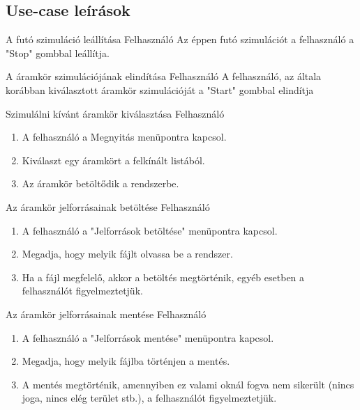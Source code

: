\subsection{Use-case leírások}
\label{sec:usecasedesc}

{A futó szimuláció leállítása}
{Felhasználó}
{Az éppen futó szimulációt a felhasználó a "Stop" gombbal leállítja.}

{A áramkör szimulációjának elindítása}
{Felhasználó}
{A felhasználó, az általa korábban kiválasztott áramkör szimulációját a "Start" gombbal elindítja}

{Szimulálni kívánt áramkör kiválasztása}
{Felhasználó}
{\vspace{-20pt}\begin{enumerate}
\setlength{\itemsep}{0cm}%
\setlength{\parskip}{0cm}%
\item A felhasználó a Megnyitás menüpontra kapcsol.
\item Kiválaszt egy áramkört a felkínált listából.
\item Az áramkör betöltődik a rendszerbe.
\end{enumerate}\vspace{-20pt}}

{Az áramkör jelforrásainak betöltése}
{Felhasználó}
{\vspace{-20pt}\begin{enumerate}
\setlength{\itemsep}{0cm}%
\setlength{\parskip}{0cm}%
\item A felhasználó a "Jelforrások betöltése" menüpontra kapcsol.
\item Megadja, hogy melyik fájlt olvassa be a rendszer.
\item Ha a fájl megfelelő, akkor a betöltés megtörténik, egyéb esetben a felhasználót figyelmeztetjük.
\end{enumerate}\vspace{-20pt}}

{Az áramkör jelforrásainak mentése}
{Felhasználó}
{\vspace{-20pt}\begin{enumerate}
\setlength{\itemsep}{0cm}%
\setlength{\parskip}{0cm}%
\item A felhasználó a "Jelforrások mentése" menüpontra kapcsol.
\item Megadja, hogy melyik fájlba történjen a mentés.
\item A mentés megtörténik, amennyiben ez valami oknál fogva nem sikerült (nincs joga, nincs elég terület stb.), a felhasználót figyelmeztetjük.
\end{enumerate}\vspace{-20pt}}

